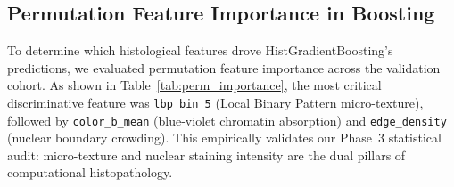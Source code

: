 \documentclass[11pt,a4paper]{article}
\begin{document}
\subsection{Permutation Feature Importance in Boosting}
To determine which histological features drove HistGradientBoosting's predictions, we evaluated permutation feature importance across the validation cohort. As shown in Table~\ref{tab:perm_importance}, the most critical discriminative feature was \texttt{lbp\_bin\_5} (Local Binary Pattern micro-texture), followed by \texttt{color\_b\_mean} (blue-violet chromatin absorption) and \texttt{edge\_density} (nuclear boundary crowding). This empirically validates our Phase~3 statistical audit: micro-texture and nuclear staining intensity are the dual pillars of computational histopathology.

\begin{table}[H]
\centering
\small
\caption{Top 8 Permutation Feature Importances for HistGradientBoosting (Track A).}
\label{tab:perm_importance}
\end{table}
\end{document}
